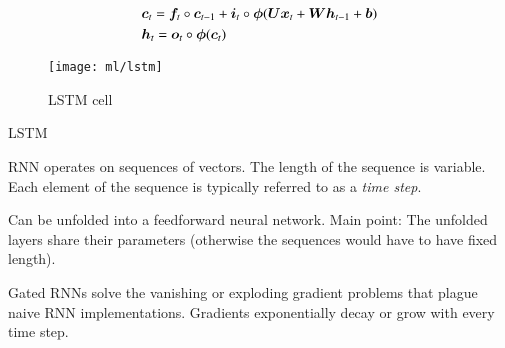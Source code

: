 \begin{align*}
  &\bm{c}_{t} = \bm{f}_{t} \circ \bm{c}_{t - 1}
    + \bm{i}_{t} \circ \bm{\phi}(\bm{U} \bm{x}_{t} + \bm{W} \bm{h}_{t-1} + \bm{b}) \\
  &\bm{h}_{t} = \bm{o}_{t} \circ \bm{\phi}(\bm{c}_{t})
\end{align*}

\begin{figure}[htbp]
  \centering

  \texttt{[image: ml/lstm]}

  \caption{LSTM cell}
  \label{fig:lstm}
\end{figure}



LSTM~\cite{lstm}




RNN operates on sequences of vectors. The length of the sequence is
variable. Each element of the sequence is typically referred to as a \emph{time
  step}.

Can be unfolded into a feedforward neural network. Main point: The unfolded
layers share their parameters (otherwise the sequences would have to have fixed
length).


Gated RNNs solve the vanishing or exploding gradient problems that plague naive
RNN implementations. Gradients exponentially decay or grow with every time step.


